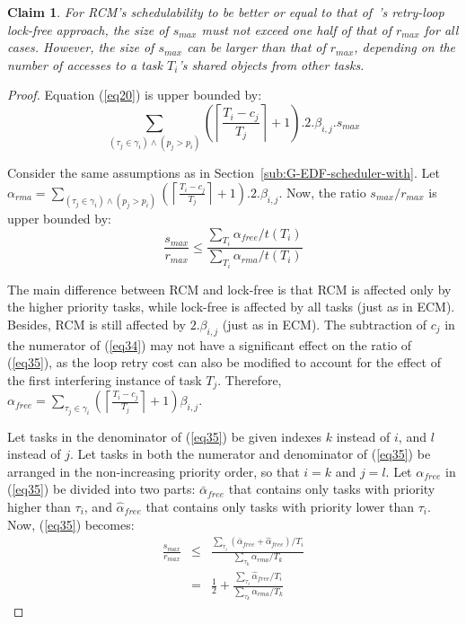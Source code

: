 \documentclass[12pt,english]{report}
\newtheorem{clm}{Claim}
\newtheorem{proof}{Proof}
\begin{document}
\begin{clm}
For RCM's schedulability to be better or equal to that of~\cite{key-5}'s retry-loop lock-free approach, the size of $s_{max}$ must not exceed one half of that of $r_{max}$ for all cases.
However, the size of $s_{max}$ can be larger than that of $r_{max}$, depending on the number of accesses to a task $T_i$'s shared objects from other tasks.
\end{clm}
\begin{proof}\normalfont
Equation (\ref{eq20}) is upper bounded by:
 \begin{equation}
\sum_{\left(\tau_{j}\in\gamma_{i}\right)\wedge\left(p_{j}> p_{i}\right)}\left(\left\lceil\frac{T_{i}-c_{j}}{T_{j}}\right\rceil+1\right).2.\beta_{i,j}.s_{max}
\label{eq34}\end{equation}

Consider the same assumptions as in Section~\ref{sub:G-EDF-scheduler-with}.
Let $\alpha_{rma}=\sum_{\left(\tau_{j}\in\gamma_{i}\right)\wedge\left(p_{j}> p_{i}\right)}\left(\left\lceil\frac{T_{i}-c_{j}}{T_{j}}\right\rceil+1\right).2.\beta_{i,j}$. Now, the ratio $s_{max}/r_{max}$ is upper bounded by:
\begin{equation}
\frac{s_{max}}{r_{max}}\le\frac{\sum_{T_{i}}\alpha_{free}/t\left(T_{i}\right)}{\sum_{T_{i}}\alpha_{rma}/t\left(T_{i}\right)}
\label{eq35}\end{equation}

The main difference between RCM and lock-free is that RCM is affected only by the higher priority tasks, while lock-free is affected by all tasks (just as in ECM). 
Besides, RCM
is still affected by $2.\beta_{i,j}$ (just as in ECM).
The subtraction of $c_{j}$ in the numerator of (\ref{eq34}) may not
have a significant effect on the ratio of (\ref{eq35}), as the loop retry 
cost can also be modified to account for the effect of the first interfering
instance of task $T_{j}$. Therefore, 
$\alpha_{free} = \sum_{\tau_{j}\in\gamma_{i}}\left(\left\lceil\frac{T_{i}-c_j}{T_{j}}\right\rceil + 1 \right)\beta_{i,j}$.

Let tasks in the denominator of (\ref{eq35}) be given indexes $k$ instead of $i$, and $l$ instead of $j$. Let tasks in both the numerator and denominator of (\ref{eq35}) be arranged in the non-increasing priority order, so that $i=k$ and $j=l$. Let $\alpha_{free}$ in (\ref{eq35}) be divided into two parts: $\bar{\alpha}_{free}$ that contains only tasks with priority higher than $\tau_i$, and $\hat{\alpha}_{free}$ that contains only tasks with priority lower than $\tau_i$. Now, (\ref{eq35}) becomes:
\begin{eqnarray}
\frac{s_{max}}{r_{max}} & \le & \frac{\sum_{\tau_{i}}(\bar{\alpha}_{free}+\hat{\alpha}_{free})/T_{i}}{\sum_{\tau_{k}}\alpha_{rma}/T_{k}}\nonumber \\
 & = & \frac{1}{2}+\frac{\sum_{\tau_{i}}\hat{\alpha}_{free}/T_{i}}{\sum_{\tau_{k}}\alpha_{rma}/T_{k}}\label{eq36}\end{eqnarray}


\end{proof}
\end{document}
